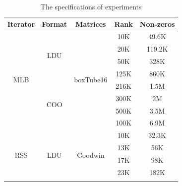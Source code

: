 \documentclass[5p,times]{elsarticle}
\begin{document}
\begin{table}[]
\centering
\caption{The specifications of experiments}
\begin{tabular}{|c|c|c|c|c|}
\hline
\textbf{Iterator}             & \textbf{Format}       & \textbf{Matrices}     & \textbf{Rank} & \textbf{Non-zeros}                          \\ \hline
\multirow{8}{*}{MLB} & \multirow{4}{*}{LDU}                       & \multirow{8}{*}{boxTube16} & 10K & 49.6K \\  \cline{4-5}
                     &                                             &             & 20K &119.2K                         \\ \cline{4-5}
                     &                                             &             & 50K &328K                         \\ \cline{4-5}
                     &                                             &             & 125K &860K                         \\ \cline{2-2} \cline{4-5}
                     & \multirow{4}{*}{COO}                        &             & 216K &1.5M                         \\ \cline{4-5}
                     &                                             &             & 300K &2M                         \\ \cline{4-5}
                     &                                             &             & 500K &3.5M                         \\ \cline{4-5}
                     &                                             &             & 100K &6.9M                         \\ \hline
\multirow{10}{*}{RSS} & \multirow{5}{*}{LDU}                        & \multirow{10}{*}{Goodwin}   &10K & 32.3K          \\ \cline{4-5}
                     &                                             &             & 13K &56K                         \\ \cline{4-5}
                     &                                             &             & 17K &98K                         \\ \cline{4-5}
                     &                                             &             & 23K &182K                         \\ \cline{4-5}
                     &                      &                         &

\end{tabular}
\end{table}
\end{document}
